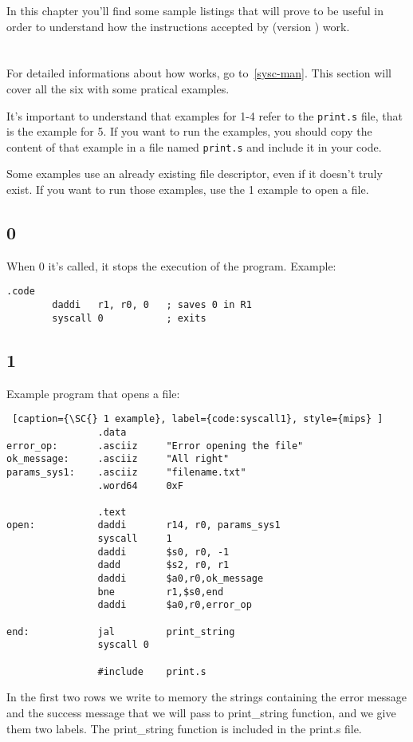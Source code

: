In this chapter you'll find some sample listings that will prove to be useful in
order to understand how the instructions accepted by \EM{} (version \EV{}) work.

\section{\SC{}}
For detailed informations about how \SC{} works, go to~\ref{sysc-man}. This
section will cover all the six \SC{} with some pratical examples.

It's important to understand that examples for \SC{} 1-4 refer to the
\texttt{print.s} file, that is the example for \SC{} 5. If you want to run the
examples, you should copy the content of that example in a file named
\texttt{print.s} and include it in your code.

Some examples use an already existing file descriptor, even if it doesn't truly
exist. If you want to run those examples, use the \SC{} 1 example to open a
file.

\subsection{\SC{} 0}
When \SC{} 0 it's called, it stops the execution of the program.
Example:
\begin{lstlisting}[caption={\SC{} 0 example}, label={code:syscall0}, style={mips}]
        .code
        daddi   r1, r0, 0	; saves 0 in R1
        syscall 0	    	; exits
\end{lstlisting}

\subsection{\SC{} 1}
Example program that opens a file:
\begin{lstlisting} [caption={\SC{} 1 example}, label={code:syscall1}, style={mips} ] 
                .data 
error_op:       .asciiz     "Error opening the file"    
ok_message:     .asciiz     "All right"
params_sys1:    .asciiz     "filename.txt"
                .word64     0xF                    

                .text
open:           daddi       r14, r0, params_sys1    
                syscall     1    
                daddi       $s0, r0, -1
                dadd        $s2, r0, r1        
                daddi       $a0,r0,ok_message            
                bne         r1,$s0,end            
                daddi       $a0,r0,error_op

end:            jal         print_string
                syscall 0
        
                #include    print.s      
\end{lstlisting}
In the first two rows we write to memory the strings containing the error
message and the success message that we will pass to print\_string function, and
we give them two labels. The print\_string function is included in the print.s
file.


